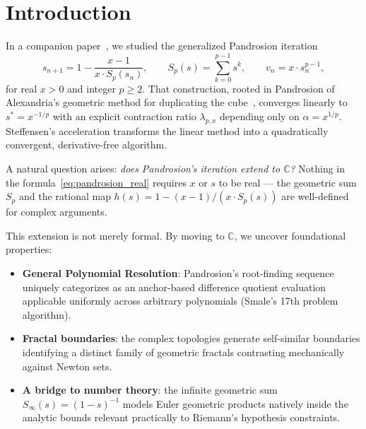 \documentclass[11pt,a4paper]{article}
\theoremstyle{definition}
\newcommand{\CC}{\mathbb{C}}
\begin{document}
\tableofcontents
\bigskip

\section{Introduction}

In a companion paper~\cite{besevic2026}, we studied the generalized Pandrosion iteration
\begin{equation}
  \label{eq:pandrosion_real}
  s_{n+1} = 1 - \frac{x-1}{x \cdot S_p(s_n)},
  \qquad
  S_p(s) = \sum_{k=0}^{p-1} s^k,
  \qquad
  v_n = x \cdot s_n^{p-1},
\end{equation}
for real $x > 0$ and integer $p \geq 2$.  That construction, rooted in Pandrosion of Alexandria's geometric method for duplicating the cube~\cite{pappus}, converges linearly to $s^* = x^{-1/p}$ with an explicit contraction ratio $\lambda_{p,x}$ depending only on $\alpha = x^{1/p}$.  Steffensen's acceleration transforms the linear method into a quadratically convergent, derivative-free algorithm.

\medskip

A natural question arises: \emph{does Pandrosion's iteration extend to $\CC$?}  Nothing in the formula~\eqref{eq:pandrosion_real} requires $x$ or $s$ to be real --- the geometric sum $S_p$ and the rational map $h(s) = 1 - (x-1)/(x \cdot S_p(s))$ are well-defined for complex arguments.

\medskip

This extension is not merely formal. By moving to $\CC$, we uncover foundational properties:
\begin{itemize}
  \item \textbf{General Polynomial Resolution}: Pandrosion's root-finding sequence uniquely categorizes as an anchor-based difference quotient evaluation applicable uniformly across arbitrary polynomials (Smale's 17th problem algorithm).
  \item \textbf{Fractal boundaries}: the complex topologies generate self-similar boundaries identifying a distinct family of geometric fractals contrasting mechanically against Newton sets.
  \item \textbf{A bridge to number theory}: the infinite geometric sum $S_\infty(s) = (1-s)^{-1}$ models Euler geometric products natively inside the analytic bounds relevant practically to Riemann's hypothesis constraints.
\end{itemize}
\end{document}

